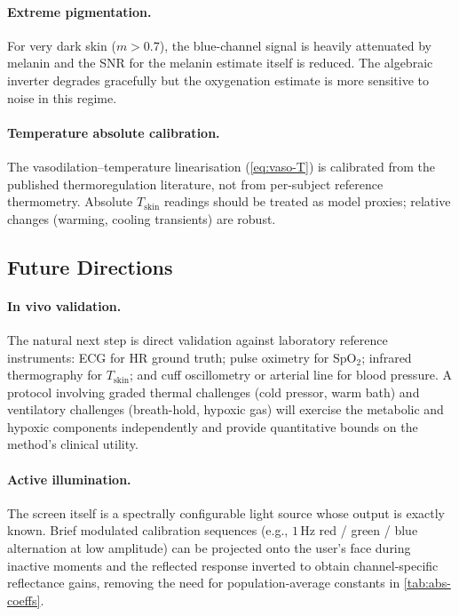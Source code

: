 \documentclass[10pt,twocolumn,a4paper]{article}
\theoremstyle{definition}
\newcommand{\SpO}{\mathrm{SpO_2}}
\newcommand{\Tskin}{T_{\mathrm{skin}}}
\newcommand{\melan}{m}
\begin{document}
\paragraph{Extreme pigmentation.} For very dark skin
($\melan>0.7$), the blue-channel signal is heavily attenuated by
melanin and the SNR for the melanin estimate itself is
reduced. The algebraic inverter degrades gracefully but the
oxygenation estimate is more sensitive to noise in this regime.

\paragraph{Temperature absolute calibration.} The
vasodilation--temperature linearisation (\cref{eq:vaso-T}) is
calibrated from the published thermoregulation literature, not from
per-subject reference thermometry. Absolute $\Tskin$ readings
should be treated as model proxies; relative changes (warming,
cooling transients) are robust.

\subsection{Future Directions}

\paragraph{In vivo validation.} The natural next step is direct
validation against laboratory reference instruments: ECG for HR
ground truth; pulse oximetry for $\SpO$; infrared thermography for
$\Tskin$; and cuff oscillometry or arterial line for blood pressure.
A protocol involving graded thermal challenges (cold pressor, warm
bath) and ventilatory challenges (breath-hold, hypoxic gas) will
exercise the metabolic and hypoxic components independently and
provide quantitative bounds on the method's clinical utility.

\paragraph{Active illumination.} The screen itself is a
spectrally configurable light source whose output is exactly known.
Brief modulated calibration sequences (e.g., $1\,\mathrm{Hz}$ red /
green / blue alternation at low amplitude) can be projected onto the
user's face during inactive moments and the reflected response
inverted to obtain channel-specific reflectance gains, removing the
need for population-average constants in
\cref{tab:abs-coeffs}.
\end{document}
